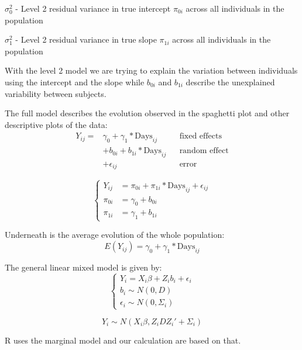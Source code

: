 \documentclass[
]{article}
\begin{document}
\(\sigma_{0}^{2}\) - Level 2 residual variance in true intercept
\(\pi_{0i}\) across all individuals in the population

\(\sigma_{1}^{2}\) - Level 2 residual variance in true slope
\(\pi_{1i}\) across all individuals in the population

With the level 2 model we are trying to explain the variation between
individuals using the intercept and the slope while \(b_{0i}\) and
\(b_{1i}\) describe the unexplained variability between subjects.

The full model describes the evolution observed in the spaghetti plot
and other descriptive plots of the data: \[\begin{aligned}
Y_{ij} =& \gamma_{0} + \gamma_{1}* \text{Days}_{ij} &&\text{fixed effects}\\
          &+ b_{0i} + b_{1i}*\text{Days}_{ij} &&\text{random effect}\\
          &+ \epsilon_{ij} &&\text{error}
\end{aligned}\]

\[
\begin{cases}
Y_{ij} &= \pi_{0i} + \pi_{1i}* \text{Days}_{ij} + \epsilon_{ij} \\
\pi_{0i} &= \gamma_{0} + b_{0i}  \\
\pi_{1i} &= \gamma_{1} + b_{1i}
\end{cases}
\]

Underneath is the average evolution of the whole population:
\[E(Y_{ij}) = \gamma_{0} + \gamma_{1}* \text{Days}_{ij}\]

The general linear mixed model is given by: \[\begin{cases}
Y_i = X_i\beta + Z_i b_i + \epsilon_i \\
b_i \sim N(0,D)\\
\epsilon_i \sim N(0,\Sigma_i)
\end{cases}\]

\[Y_i \sim N(X_i\beta, Z_iDZ_i'+\Sigma_i)\]

R uses the marginal model and our calculation are based on that.
\end{document}
